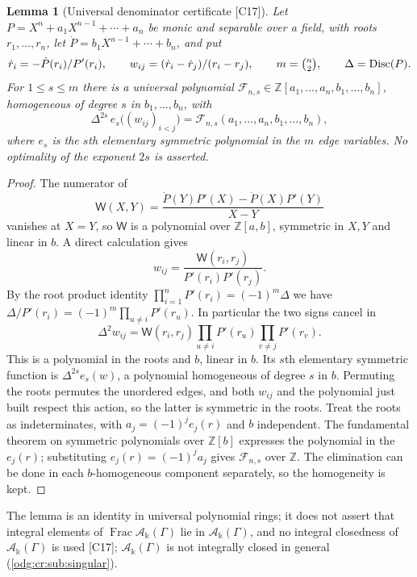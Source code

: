 \documentclass[11pt,oneside]{article}
\numberwithin{equation}{section}
\newtheorem{lemma}[lemma]{Lemma}
\theoremstyle{definition}
\theoremstyle{remark}
\newcommand{\Z}{\mathbb Z}
\newcommand{\Frac}{\operatorname{Frac}}
\newcommand{\src}[1]{\textup{\textsf{\small[#1]}}}
\newcommand{\crA}{\mathcal A_\Bbbk(\Gamma)}
\newcommand{\Disc}{\operatorname{Disc}}
\begin{document}
\begin{lemma}[Universal denominator certificate \src{C17}]\label{odg:disc:lem:certificate}
Let $P=X^n+a_1X^{n-1}+\cdots+a_n$ be monic and separable over a field, with roots
$r_1,\ldots,r_n$, let $\dot P=b_1X^{n-1}+\cdots+b_n$, and put
\[
 \dot r_i=-\dot P(r_i)/P'(r_i),\qquad w_{ij}=(\dot r_i-\dot r_j)/(r_i-r_j),\qquad
 m=\tbinom n2,\qquad \Delta=\Disc(P).
\]
For $1\le s\le m$ there is a universal polynomial
$\mathcal F_{n,s}\in\Z[a_1,\ldots,a_n,b_1,\ldots,b_n]$, homogeneous of degree $s$ in
$b_1,\ldots,b_n$, with
\begin{equation}\label{odg:disc:eq:certificate}
 \Delta^{2s}\,e_s\bigl((w_{ij})_{i<j}\bigr)=\mathcal F_{n,s}(a_1,\ldots,a_n,b_1,\ldots,b_n),
\end{equation}
where $e_s$ is the $s$th elementary symmetric polynomial in the $m$ edge variables. No
optimality of the exponent $2s$ is asserted.
\end{lemma}
\begin{proof}
The numerator of
\begin{equation}\label{odg:disc:eq:W}
 \mathsf W(X,Y)=\frac{\dot P(Y)P'(X)-\dot P(X)P'(Y)}{X-Y}
\end{equation}
vanishes at $X=Y$, so $\mathsf W$ is a polynomial over $\Z[a,b]$, symmetric in $X,Y$ and
linear in $b$. A direct calculation gives
\begin{equation}\label{odg:disc:eq:wformula}
 w_{ij}=\frac{\mathsf W(r_i,r_j)}{P'(r_i)P'(r_j)}.
\end{equation}
By the root product identity $\prod_{i=1}^nP'(r_i)=(-1)^m\Delta$ we have
$\Delta/P'(r_i)=(-1)^m\prod_{u\ne i}P'(r_u)$. In particular the two signs cancel in
\[
 \Delta^2w_{ij}=\mathsf W(r_i,r_j)
       \prod_{u\ne i}P'(r_u)\prod_{v\ne j}P'(r_v).
\]
This is a polynomial in the roots and $b$, linear in $b$. Its $s$th elementary symmetric
function is $\Delta^{2s}e_s(w)$, a polynomial homogeneous of degree $s$ in $b$.
Permuting the roots permutes the unordered edges,
and both $w_{ij}$ and the polynomial just built respect this action, so the latter is
symmetric in the roots. Treat the roots as indeterminates, with $a_j=(-1)^je_j(r)$ and $b$
independent. The fundamental theorem on symmetric polynomials over $\Z[b]$ expresses the
polynomial in the $e_j(r)$; substituting $e_j(r)=(-1)^ja_j$ gives $\mathcal F_{n,s}$ over
$\Z$. The elimination can be done in each $b$-homogeneous component separately, so the
homogeneity is kept.
\end{proof}

The lemma is an identity in universal polynomial rings; it does not assert that integral
elements of $\Frac\crA$ lie in $\crA$, and no integral closedness of $\crA$ is used
\src{C17}; $\crA$ is not integrally closed in general (\cref{odg:cr:sub:singular}).
\end{document}
